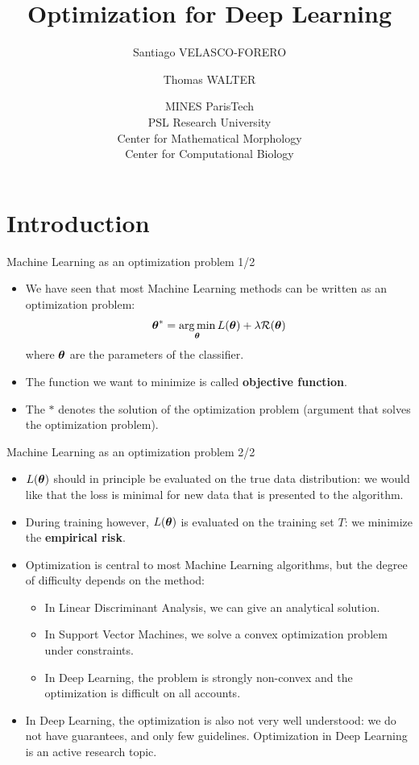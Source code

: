 \documentclass[handout,xcolor=pdftex,dvipsnames,table,mathserif]{beamer}
\title{Optimization for Deep Learning}
\author{Santiago VELASCO-FORERO \inst{1} \and Thomas WALTER \inst{2} }
\institute{\inst{1} \href{http://cmm.ensmp.fr/~velasco/}{http://cmm.ensmp.fr/~velasco/} \and
           \inst{2} \href{http://members.cbio.mines-paristech.fr/~twalter/}{http://members.cbio.mines-paristech.fr/~twalter/}}
\date{MINES ParisTech\\
  PSL Research University\\
  Center for Mathematical Morphology\\
  Center for Computational Biology
}
\begin{document}
\begin{frame}
\titlepage
\end{frame}



\section{Introduction}

\begin{frame}{Machine Learning as an optimization problem 1/2}
\begin{itemize}
	\item We have seen that most Machine Learning methods can be written as an optimization problem:
	\begin{equation*}
		\boldsymbol{\theta} ^{\ast} = \operatorname*{arg\,min}_{\boldsymbol{\theta}} L (\boldsymbol{\theta}) + \lambda \mathcal{R}(\boldsymbol{\theta})
	\end{equation*}
	where $\boldsymbol{\theta}$ are the parameters of the classifier. 
	\item The function we want to minimize is called \textbf{objective function}. 
	\item The ${\ast}$ denotes the solution of the optimization problem (argument that solves the optimization problem).  
\end{itemize}
\end{frame}

\begin{frame}{Machine Learning as an optimization problem 2/2}
\begin{itemize}
	\item $L (\boldsymbol{\theta})$ should in principle be evaluated on the true data distribution: we would like that the loss is minimal for new data that is presented to the algorithm. 
	\item During training however, $L (\boldsymbol{\theta})$ is evaluated on the training set $T$: we minimize the \textbf{empirical risk}.
	\item Optimization is central to most Machine Learning algorithms, but the degree of difficulty depends on the method:
	\begin{itemize}
		\item In Linear Discriminant Analysis, we can give an analytical solution.
		\item In Support Vector Machines, we solve a convex optimization problem under constraints.
		\item In Deep Learning, the problem is strongly non-convex and the optimization is difficult on all accounts. 
	\end{itemize}
	\item In Deep Learning, the optimization is also not very well understood: we do not have guarantees, and only few guidelines. Optimization in Deep Learning is an active research topic. 
\end{itemize}
\end{frame}
\end{document}
